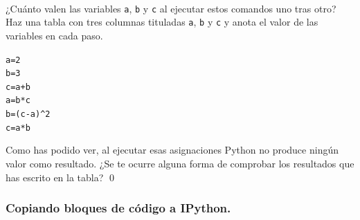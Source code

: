 \documentclass[10pt,a4paper]{article}\usepackage[]{graphicx}\usepackage[]{color}
\makeatletter
\newcommand{\hlnum}[1]{\textcolor[rgb]{0.686,0.059,0.569}{#1}}%
\newcommand{\hlopt}[1]{\textcolor[rgb]{0,0,0}{#1}}%
\newcommand{\hlstd}[1]{\textcolor[rgb]{0.345,0.345,0.345}{#1}}%
\newcommand{\hlkwb}[1]{\textcolor[rgb]{0.69,0.353,0.396}{#1}}%
\newenvironment{kframe}{%
 \def\at@end@of@kframe{}%
 \ifinner\ifhmode%
  \def\at@end@of@kframe{\end{minipage}}%
  \begin{minipage}{\columnwidth}%
 \fi\fi%
 \def\FrameCommand##1{\hskip\@totalleftmargin \hskip-\fboxsep
 \colorbox{shadecolor}{##1}\hskip-\fboxsep
     \hskip-\linewidth \hskip-\@totalleftmargin \hskip\columnwidth}%
 \MakeFramed {\advance\hsize-\width
   \@totalleftmargin\z@ \linewidth\hsize
   \@setminipage}}%
 {\par\unskip\endMakeFramed%
 \at@end@of@kframe}
\newenvironment{knitrout}{}{} %
\makeatother
\begin{document}
\begin{ejercicio}
\label{tut02:ejercicio08}
\quad\\
¿Cuánto valen las variables {\tt a}, {\tt b} y {\tt c} al ejecutar estos comandos uno tras otro? Haz una tabla con tres columnas tituladas {\tt a}, {\tt b} y {\tt c} y anota el valor de las variables en cada paso.
\begin{knitrout}
\color{fgcolor}\begin{kframe}
\begin{alltt}
\hlstd{a} \hlkwb{=} \hlnum{2}
\hlstd{b} \hlkwb{=} \hlnum{3}
\hlstd{c} \hlkwb{=} \hlstd{a} \hlopt{+} \hlstd{b}
\hlstd{a} \hlkwb{=} \hlstd{b} \hlopt{*} \hlstd{c}
\hlstd{b} \hlkwb{=} \hlstd{(c} \hlopt{-} \hlstd{a)}\hlopt{^}\hlnum{2}
\hlstd{c} \hlkwb{=} \hlstd{a} \hlopt{*} \hlstd{b}
\end{alltt}
\end{kframe}
\end{knitrout}
Como has podido ver, al ejecutar esas asignaciones Python no produce ningún valor como resultado. ¿Se te ocurre alguna forma de comprobar los resultados que has escrito en la tabla?
\qed
\end{ejercicio}

\subsubsection*{Copiando bloques de código a IPython.}
\label{tut02:subsubsec:copiandoBloquesCodigoIPython}
\end{document}
